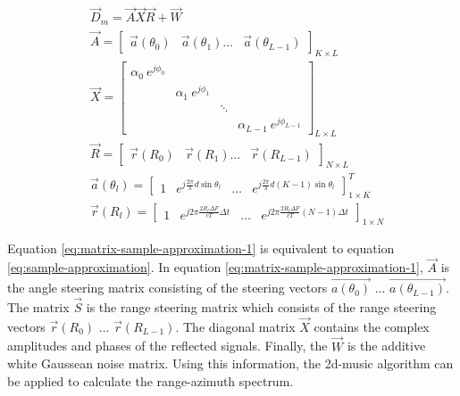 \begin{align}
\label{eq:matrix-sample-approximation-1}
    &\vec{D}_m = \vec{A}\vec{X}\vec{R} + \vec{W} \\
\label{eq:matrix-sample-approximation-2}
    &\vec{A} = \begin{bmatrix} \vec{a}(\theta_0) & \vec{a}(\theta_1) \ldots & \vec{a}(\theta_{L-1}) \end{bmatrix}_{K \times L} \\
\label{eq:matrix-sample-approximation-3}
    &\vec{X} = \begin{bmatrix} \alpha_{0}~e^{j\phi_{0}} & & & \\ & \alpha_{1}~e^{j\phi_{1}} & & \\ & & \ddots & \\ & & & \alpha_{L-1}~e^{j\phi_{L-1}} \end{bmatrix}_{L \times L} \\
\label{eq:matrix-sample-approximation-4}
    &\vec{R} = \begin{bmatrix} \vec{r}(R_0) & \vec{r}(R_1) \ldots & \vec{r}(R_{L-1}) \end{bmatrix}_{N \times L} \\
\label{eq:matrix-sample-approximation-5}
    &\vec{a}(\theta_l) = \begin{bmatrix} 1 & e^{ j \frac{2 \pi}{ \lambda } d \sin \theta_{l}} & \ldots  & e^{ j \frac{2 \pi}{ \lambda } d(K-1) \sin \theta_{l}} \end{bmatrix}_{1 \times K}^{T} \\
\label{eq:matrix-sample-approximation-6}
    &\vec{r}(R_l) = \begin{bmatrix} 1 & e^{j 2 \pi \frac{2 R_{l} \Delta F}{c T} \Delta t } & \ldots & e^{j 2 \pi \frac{2 R_{l} \Delta F}{c T} (N-1) \Delta t } \end{bmatrix}_{1 \times N}
\end{align}

Equation \ref{eq:matrix-sample-approximation-1} is equivalent to equation \ref{eq:sample-approximation}.
In equation \ref{eq:matrix-sample-approximation-1}, $\vec{A}$ is the angle steering matrix consisting of the steering vectors $\vec{a(\theta_0)}$ ... $\vec{a(\theta_{L-1})}$.
The matrix $\vec{S}$ is the range steering matrix which consists of the range steering vectors $\vec{r}(R_0)$ ... $\vec{r}(R_{L-1})$.
The diagonal matrix $\vec{X}$ contains the complex amplitudes and phases of the reflected signals.
Finally, the $\vec{W}$ is the additive white Gaussean noise matrix.
Using this information, the \gls{2d-music} algorithm can be applied to calculate the range-azimuth spectrum.

